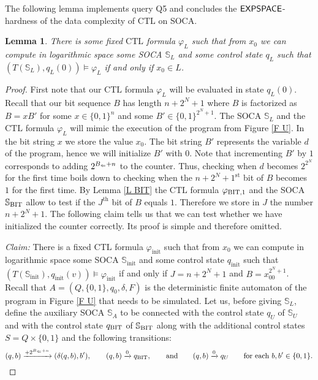\documentclass[times,envcountsame]{llncs}
\newtheorem{lemma}[theorem]{{\bf Lemma}}
\newcommand{\Soca}{\mathbb{S}}
\newcommand{\ctl}{\text{CTL}}
\begin{document}
\noindent
The following lemma implements query Q5 and concludes the
${\mathsf{EXPSPACE}}$-hardness of the data complexity of $\ctl$ on SOCA.

\begin{lemma}
There is some fixed $\ctl$ formula $\varphi_L$ such that from $x_0$
we can compute in logarithmic space some SOCA $\Soca_L$ and some
control state $q_L$ such that $(T(\Soca_L),q_L(0))\models\varphi_L$
if and only if $x_0\in L$.
\end{lemma}
\begin{proof}
First note that our $\ctl$ formula $\varphi_L$ will be evaluated in state $q_L(0)$.
Recall that our bit sequence $B$ has length $n+2^N+1$ where $B$ is factorized
as $B=xB'$
for some $x\in\{0,1\}^n$ and some $B'\in\{0,1\}^{2^N+1}$.
The SOCA $\Soca_L$ and the $\ctl$ formula $\varphi_L$ will mimic the execution
of the program from Figure \ref{F U}.
In the bit string $x$ we store the value $x_0$.
The bit string $B'$ represents
the variable $d$ of the program, hence we will initialize
$B'$ with $0$.
Note that incrementing $B'$ by $1$ corresponds to adding $2^{B_\Leftarrow+n}$ to the counter.
Thus, checking when $d$ becomes $2^{2^N}$ for the first time boils down to checking
when the $n+2^N+1^{\text{st}}$ bit of $B$ becomes $1$ for the first time.
 By Lemma
\ref{L BIT} the $\ctl$ formula $\varphi_{\text{BIT},1}$ and the SOCA $\Soca_\BIT$ allow to test
if the $J^{\text{th}}$ bit of $B$ equals $1$.
Therefore we store in $J$ the number $n+2^N+1$.
The following claim tells us that we can test whether we have
initialized the counter correctly.
Its proof is simple and therefore omitted.
\newcommand{\init}{\text{init}}

\medskip

\noindent
{\em Claim:} There is a fixed $\ctl$ formula $\varphi_\init$ such that from
$x_0$ we can compute in logarithmic space some SOCA $\Soca_\init$ and
some control state $q_\init$ such that
$(T(\Soca_\init),q_\init(v))\models\varphi_\init$
if and only if $J=n+2^N+1$ and $B=x_00^{2^N+1}$.\\

\noindent
Recall that $A=(Q,\{0,1\},q_0,\delta,F)$ is the deterministic finite automaton
of the program in Figure \ref{F U} that needs to be simulated.
Let us, before giving $\Soca_L$, define the auxiliary SOCA $\Soca_A$
to be connected with the control state $q_U$ of $\Soca_U$ and with the control
state $q_{\text{BIT}}$ of $\Soca_\BIT$ along with the additional
control states $S=Q\times\{0,1\}$ and
the following transitions:
$$
(q,b)\xrightarrow{+2^{B_\Leftarrow+n}}(\delta(q,b),b'),\qquad
(q,b)\xrightarrow{0}q_{\text{BIT}},\qquad\text{and}\qquad
(q,b)\xrightarrow{0}q_U\qquad\text{for each }
b,b'\in\{0,1\}.
$$


\end{proof}
\end{document}
